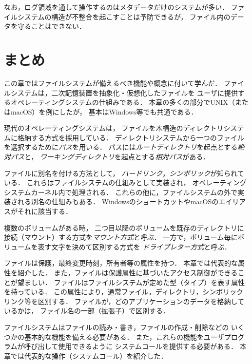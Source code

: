 なお，ログ領域を通して操作するのはメタデータだけのシステムが多い．
ファイルシステムの構造が不整合を起こすことは予防できるが，
ファイル内のデータを守ることはできない．

\section{まとめ}
この章ではファイルシステムが備えるべき機能や概念に付いて学んだ．
ファイルシステムは，二次記憶装置を抽象化・仮想化したファイルを
ユーザに提供するオペレーティングシステムの仕組みである．
本章の多くの部分でUNIX（またはmacOS）を例にしたが，
基本はWindows等でも共通である．

現代のオペレーティングシステムは，
ファイルを木構造のディレクトリシステムに格納する方式を採用している．
ディレクトリシステムから一つのファイルを選択するために\emph{パス}を用いる．
パスには\emph{ルートディレクトリ}を起点とする\emph{絶対パス}と，
\emph{ワーキングディレクトリ}を起点とする\emph{相対パス}がある．

ファイルに別名を付ける方法として，
\emph{ハードリンク}，\emph{シンボリック}が知られている．
これらはファイルシステムの仕組みとして実装され，
オペレーティングシステムカーネル内で処理される．
これらの他に，ファイルシステムの外で実装される別名の仕組みもある．
WindowsのショートカットやmacOSのエイリアスがそれに該当する．

複数のボリュームがある時，
二つ目以降のボリュームを既存のディレクトリに
接続（マウント）する方式を\emph{マウント方式}と呼ぶ．
一方で，ボリューム毎にボリュームを表す文字を決めて区別する方式を
\emph{ドライブレター方式}と呼ぶ．

ファイルは保護，最終変更時刻，所有者等の属性を持つ．
本章では代表的な属性を紹介した．
また，ファイルは保護属性に基づいたアクセス制御ができることが望ましい．
ファイルはファイルシステムが定めた型（タイプ）を表す属性を持っている．
この属性により，通常ファイル，ディレクトリ，シンボリックリンク等を区別する．
ファイルが，どのアプリケーションのデータを格納しているかは，
ファイル名の一部（拡張子）で区別する．

ファイルシステムはファイルの読み・書き，ファイルの作成・削除などの
いくつかの基本的な機能を備える必要がある．
また，これらの機能をユーザプログラムが呼び出して使用できるように
システムコールを提供する必要がある．
本章では代表的な操作（システムコール）を紹介した．

